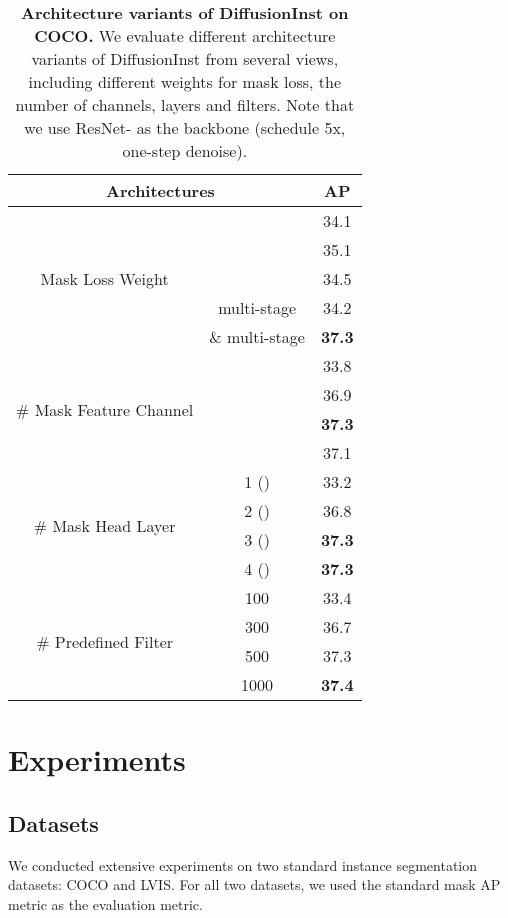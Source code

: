 \documentclass{article}
\begin{document}
\begin{table}[thb]
\centering
\begin{tabular}{c|c|c}
\toprule
\multicolumn{2}{c|}{Architectures}           & AP  \\ \hline
\multirow{5}{*}{Mask Loss Weight}  &     &   34.1   \\
&   & 35.1 \\ 
&   &  34.5\\ 
& multi-stage & 34.2 \\ 
&  \& multi-stage & \textbf{37.3} \\ \hline
\multirow{4}{*}{\# Mask Feature Channel}  &     &  33.8    \\
&  & 36.9 \\ 
&  & \textbf{37.3} \\ 
&  & 37.1 \\ \hline
\multirow{4}{*}{\# Mask Head Layer}  & 1 () &  33.2 \\
& 2 ()  &     36.8   \\
& 3 ()  &     \textbf{37.3}   \\
& 4 ()  &     \textbf{37.3}  \\ \hline
\multirow{4}{*}{\# Predefined Filter}  & 100 & 33.4  \\
& 300  &   36.7     \\
& 500  &    37.3  \\
& 1000  &    \textbf{37.4}    \\
\bottomrule
\end{tabular}
\caption{\textbf{Architecture variants of DiffusionInst on COCO.} We evaluate different architecture variants of DiffusionInst from several views, including different weights for mask loss, the number of channels, layers and filters. Note that we use ResNet- as the backbone (schedule 5x, one-step denoise).}
\label{tab:ablation}
\end{table}




\section{Experiments}

\subsection{Datasets}

We conducted extensive experiments on two standard
instance segmentation datasets: COCO\cite{COCO} and LVIS\cite{LVIS}. For all two datasets, we used the standard mask AP metric\cite{COCO} as the evaluation metric.
\end{document}
